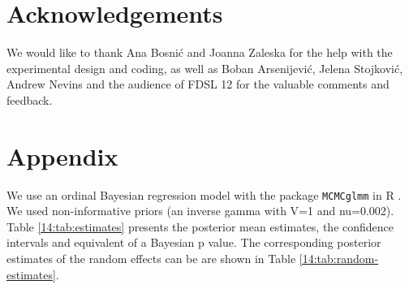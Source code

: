 \documentclass[output=paper,modfonts,newtxmath,hidelinks]{langscibook}
\begin{document}
\section*{Acknowledgements}

We would like to thank Ana Bosni\'{c} and Joanna Zaleska for the help with the experimental design and coding, as well as Boban Arsenijevi\'{c}, Jelena Stojkovi\'{c}, Andrew Nevins and the audience of FDSL 12 for the valuable comments and feedback.   



\section*{Appendix}	
		
We use an ordinal Bayesian regression model with the package \texttt{MCMCglmm} \citep{Hadfield.2010} in R \citep{rcore}. We used non-informative priors (an inverse gamma with V=1 and nu=0.002).  Table \ref{14:tab:estimates} presents the posterior mean estimates, the confidence intervals and equivalent of a Bayesian p value. The corresponding posterior estimates of the random effects can be are shown in Table \ref{14:tab:random-estimates}.
\end{document}
